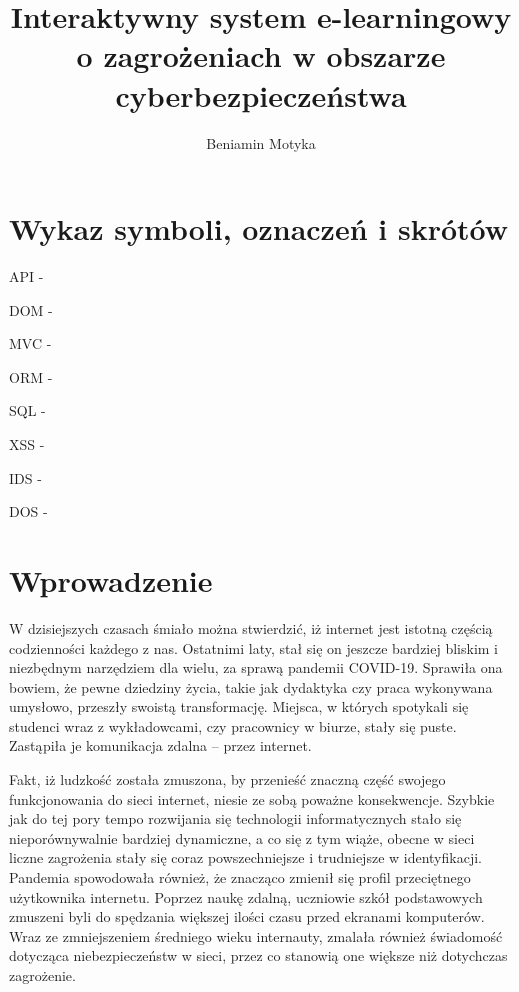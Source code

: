 \documentclass[12pt,twoside]{article}
\author{Beniamin Motyka}
\title{Interaktywny system e-learningowy o zagrożeniach w obszarze cyberbezpieczeństwa}
\begin{document}
\maketitle

\blankpage

\tableofcontents

\clearpage
\blankpage

\clearpage
\section*{Wykaz symboli, oznaczeń i skrótów}
%

API - 

DOM - 

MVC - 

ORM - 

SQL -

XSS - 

IDS - 

DOS -
\clearpage
\section{Wprowadzenie}

W dzisiejszych czasach śmiało można stwierdzić, iż	internet jest istotną częścią codzienności każdego z nas. Ostatnimi laty, stał się on jeszcze bardziej bliskim i niezbędnym narzędziem dla wielu, za sprawą pandemii COVID-19. Sprawiła ona bowiem, że pewne dziedziny życia, takie jak dydaktyka czy praca wykonywana umysłowo, przeszły swoistą transformację. Miejsca, w których spotykali się studenci wraz z wykładowcami, czy pracownicy w biurze, stały się puste. Zastąpiła je komunikacja zdalna -- przez internet. 

Fakt, iż ludzkość została zmuszona, by przenieść znaczną część swojego funkcjonowania do sieci internet, niesie ze sobą poważne konsekwencje. Szybkie jak do tej pory tempo rozwijania się technologii informatycznych stało się nieporównywalnie bardziej dynamiczne, a co się z tym wiąże, obecne w sieci liczne zagrożenia stały się coraz powszechniejsze i trudniejsze w identyfikacji. Pandemia spowodowała również, że znacząco zmienił się profil przeciętnego użytkownika internetu. Poprzez naukę zdalną, uczniowie szkół podstawowych zmuszeni byli do spędzania większej ilości czasu przed ekranami komputerów. Wraz ze zmniejszeniem średniego wieku internauty, zmalała również świadomość dotycząca niebezpieczeństw w sieci, przez co stanowią one większe niż dotychczas zagrożenie. 
\end{document}
